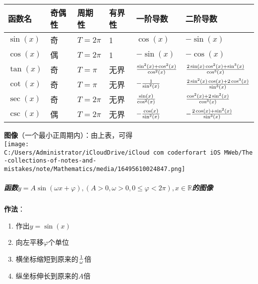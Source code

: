 \documentclass[
]{article}
\begin{document}
\begin{longtable}[]{@{}llllll@{}}
\toprule
函数名 & 奇偶性 & 周期性 & 有界性 & 一阶导数 & 二阶导数 \\
\midrule
\endhead
\(\sin(x)\) & 奇 & \(T = 2\pi\) & 1 & \(\cos(x)\) & \(-\sin(x)\) \\
\(\cos(x)\) & 偶 & \(T = 2\pi\) & 1 & \(-\sin(x)\) & \(-\cos(x)\) \\
\(\tan(x)\) & 奇 & \(T = \pi\) & 无界 &
\({\sin^2(x) + \cos^2(x)}\over \cos^2(x)\) &
\({2\sin(x)\cos^2(x) + \sin^3(x)}\over \cos^3(x)\) \\
\(\cot(x)\) & 奇 & \(T = \pi\) & 无界 & \(-{1 \over \sin^2(x)}\) &
\({2\sin^2(x)\cos(x)+2\cos^3(x)}\over \sin^3(x)\) \\
\(\sec(x)\) & 奇 & \(T = 2\pi\) & 无界 & \(\sin(x) \over \cos^2(x)\) &
\({\cos^2(x) + 2\sin^2(x)}\over \cos^3(x)\) \\
\(\csc(x)\) & 偶 & \(T = 2\pi\) & 无界 & \(-{\cos(x) \over \sin^2(x)}\)
& \(-{{2\cos(x) + \sin^2(x)}\over \sin^3(x)}\) \\
\bottomrule
\end{longtable}

\textbf{图像}（一个最小正周期内）：由上表，可得\\
\texttt{[image: C:/Users/Administrator/iCloudDrive/iCloud~com~coderforart~iOS~MWeb/The-collections-of-notes-and-mistakes/note/Mathematics/media/16495610024847.png]}

\hypertarget{ux51fdux6570y--asinomega-x--varphi-a--0-omega--0-0-leqslant-varphi--2pi-x-in-mathbb-rux7684ux56feux50cf}{%
\subparagraph{\texorpdfstring{函数\(y = A\sin(\omega x + \varphi), (A > 0, \omega > 0, 0 \leqslant \varphi < 2\pi), x \in \mathbb R\)的图像}{函数y = A\textbackslash sin(\textbackslash omega x + \textbackslash varphi), (A \textgreater{} 0, \textbackslash omega \textgreater{} 0, 0 \textbackslash leqslant \textbackslash varphi \textless{} 2\textbackslash pi), x \textbackslash in \textbackslash mathbb R的图像}}\label{ux51fdux6570y--asinomega-x--varphi-a--0-omega--0-0-leqslant-varphi--2pi-x-in-mathbb-rux7684ux56feux50cf}}

\textbf{作法}：

\begin{enumerate}
\def\labelenumi{\arabic{enumi}.}
\item
  作出\(y = \sin(x)\)
\item
  向左平移\(\varphi\)个单位
\item
  横坐标缩短到原来的\(1 \over \omega\)倍
\item
  纵坐标伸长到原来的\(A\)倍
\end{enumerate}
\end{document}
